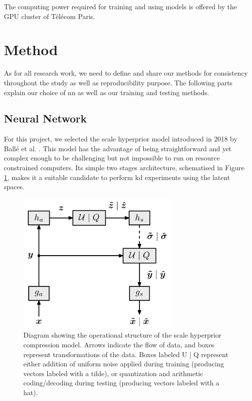 The computing power required for training and using models is offered by the GPU cluster of Télécom Paris.

\section{Method}
As for all research work, we need to define and share our methods for consistency throughout the study as well as reproducibility purpose. The following parts explain our choice of \acrshort{nn} as well as our training and testing methods.

\subsection{Neural Network}
For this project, we selected the scale hyperprior model introduced in 2018 by Ballé et al. \cite{ballé2018variationalimagecompressionscale}. This model has the advantage of being straightforward and yet complex enough to be challenging but not impossible to run on resource constrained computers. Its simple two stages architecture, schematised in Figure \ref{scale_hyperprior_1}, makes it a suitable candidate to perform \acrshort{kd} experiments using the latent spaces.

\begin{figure}
    \centering
    \includegraphics[width=8cm]{img/scale_hyperprior_1.png}
    \caption[Diagram showing the operational structure of the scale hyperprior compression model.]{Diagram showing the operational structure of the scale hyperprior compression model. Arrows indicate the flow of data, and boxes represent transformations of the data. Boxes labeled U | Q represent either addition of uniform noise applied during training (producing vectors labeled with a tilde), or quantization and arithmetic coding/decoding during testing (producing vectors labeled with a hat).}
    \label{scale_hyperprior_1}
\end{figure} %

